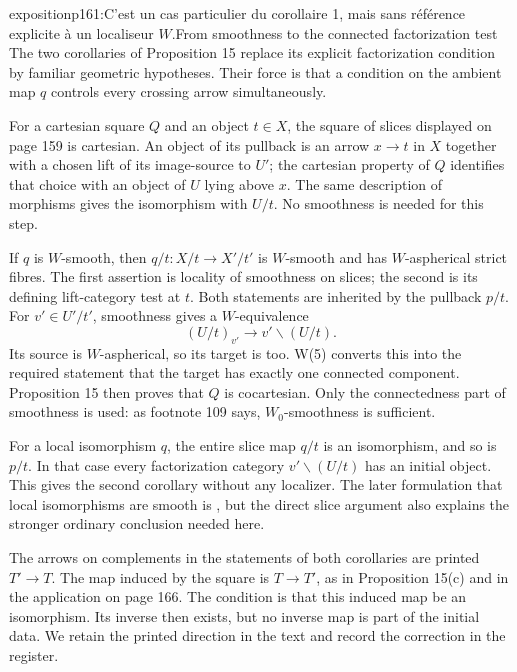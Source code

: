 \begin{dcomment}{exposition}{p161:C'est un cas particulier du corollaire 1, mais sans référence explicite à un localiseur $W$.}{From smoothness to the connected factorization test}
The two corollaries of Proposition 15 replace its explicit factorization condition by familiar geometric hypotheses. Their force is that a condition on the ambient map $q$ controls every crossing arrow simultaneously.

For a cartesian square $Q$ and an object $t\in X$, the square of slices displayed on page 159 is cartesian. An object of its pullback is an arrow $x\to t$ in $X$ together with a chosen lift of its image-source to $U'$; the cartesian property of $Q$ identifies that choice with an object of $U$ lying above $x$. The same description of morphisms gives the isomorphism with $U/t$. No smoothness is needed for this step.

If $q$ is $W$-smooth, then $q/t:X/t\to X'/t'$ is $W$-smooth and has $W$-aspherical strict fibres. The first assertion is locality of smoothness on slices; the second is its defining lift-category test at $t$. Both statements are inherited by the pullback $p/t$. For $v'\in U'/t'$, smoothness gives a $W$-equivalence
\[
                (U/t)_{v'}\longrightarrow v'\backslash(U/t).
\]
Its source is $W$-aspherical, so its target is too. W(5) converts this into the required statement that the target has exactly one connected component. Proposition 15 then proves that $Q$ is cocartesian. Only the connectedness part of smoothness is used: as footnote 109 says, $W_0$-smoothness is sufficient.

For a local isomorphism $q$, the entire slice map $q/t$ is an isomorphism, and so is $p/t$. In that case every factorization category $v'\backslash(U/t)$ has an initial object. This gives the second corollary without any localizer. The later formulation that local isomorphisms are smooth is \citet[Proposition 4.9]{Maltsiniotis2005Asphericite}, but the direct slice argument also explains the stronger ordinary conclusion needed here.

The arrows on complements in the statements of both corollaries are printed $T'\to T$. The map induced by the square is $T\to T'$, as in Proposition 15(c) and in the application on page 166. The condition is that this induced map be an isomorphism. Its inverse then exists, but no inverse map is part of the initial data. We retain the printed direction in the text and record the correction in the register.
\end{dcomment}

